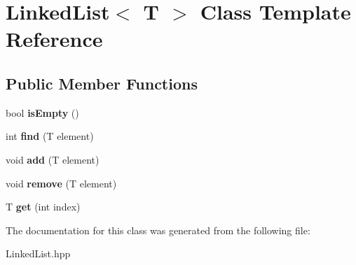 \hypertarget{class_linked_list}{}\section{Linked\+List$<$ T $>$ Class Template Reference}
\label{class_linked_list}
\subsection*{Public Member Functions}
\begin{DoxyCompactItemize}
\item 
\mbox{\label{class_linked_list_a7ecbb28e82117a680839ed0dc28ebdce}} 
bool {\bfseries is\+Empty} ()
\item 
\mbox{\label{class_linked_list_a924e217dd525b84492e9f0dc61db96bc}} 
int {\bfseries find} (T element)
\item 
\mbox{\label{class_linked_list_ab7364799e5965dd59d4f5952cb953287}} 
void {\bfseries add} (T element)
\item 
\mbox{\label{class_linked_list_a6c4973ae9956ddb037a9093cffa2adb1}} 
void {\bfseries remove} (T element)
\item 
\mbox{\label{class_linked_list_a25079ed9b408efad63a1522c818d8705}} 
T {\bfseries get} (int index)
\end{DoxyCompactItemize}


The documentation for this class was generated from the following file\+:\begin{DoxyCompactItemize}
\item 
Linked\+List.\+hpp\end{DoxyCompactItemize}
